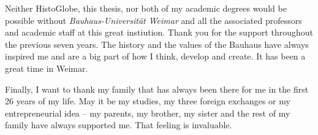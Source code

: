 Neither HistoGlobe, this thesis, nor both of my academic degrees would be possible without \emph{Bauhaus-Universität Weimar} and all the associated professors and academic staff at this great instiution. Thank you for the support throughout the previous seven years. The history and the values of the Bauhaus have always inspired me and are a big part of how I think, develop and create. It has been a great time in Weimar.

Finally, I want to thank my family that has always been there for me in the first 26 years of my life. May it be my studies, my three foreign exchanges or my entrepreneurial idea -- my parents, my brother, my sister and the rest of my family have always supported me. That feeling is invaluable.


